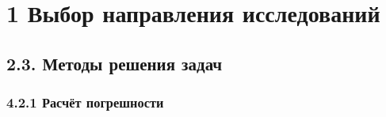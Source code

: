 \section{1 Выбор направления исследований} %

\subsection{2.3. Методы решения задач} %

\subsubsection{4.2.1 Расчёт погрешности} %
